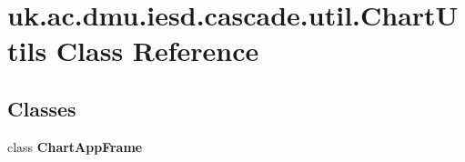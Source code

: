 \hypertarget{classuk_1_1ac_1_1dmu_1_1iesd_1_1cascade_1_1util_1_1_chart_utils}{\section{uk.\-ac.\-dmu.\-iesd.\-cascade.\-util.\-Chart\-Utils Class Reference}
\label{classuk_1_1ac_1_1dmu_1_1iesd_1_1cascade_1_1util_1_1_chart_utils}
}
\subsection*{Classes}
\begin{DoxyCompactItemize}
\item 
class {\bfseries Chart\-App\-Frame}
\end{DoxyCompactItemize}
